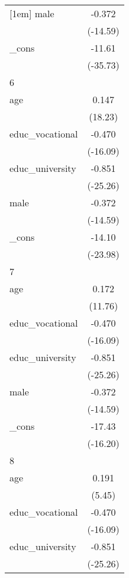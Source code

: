 {\begin{tabular}{l*{1}{c}}
[1em]
male        &      -0.372\sym{***}\\
            &    (-14.59)         \\
[1em]
\_cons      &      -11.61\sym{***}\\
            &    (-35.73)         \\
\hline
6           &                     \\
age         &       0.147\sym{***}\\
            &     (18.23)         \\
[1em]
educ\_vocational&      -0.470\sym{***}\\
            &    (-16.09)         \\
[1em]
educ\_university&      -0.851\sym{***}\\
            &    (-25.26)         \\
[1em]
male        &      -0.372\sym{***}\\
            &    (-14.59)         \\
[1em]
\_cons      &      -14.10\sym{***}\\
            &    (-23.98)         \\
\hline
7           &                     \\
age         &       0.172\sym{***}\\
            &     (11.76)         \\
[1em]
educ\_vocational&      -0.470\sym{***}\\
            &    (-16.09)         \\
[1em]
educ\_university&      -0.851\sym{***}\\
            &    (-25.26)         \\
[1em]
male        &      -0.372\sym{***}\\
            &    (-14.59)         \\
[1em]
\_cons      &      -17.43\sym{***}\\
            &    (-16.20)         \\
\hline
8           &                     \\
age         &       0.191\sym{***}\\
            &      (5.45)         \\
[1em]
educ\_vocational&      -0.470\sym{***}\\
            &    (-16.09)         \\
[1em]
educ\_university&      -0.851\sym{***}\\
            &    (-25.26)         \\

\end{tabular}}

